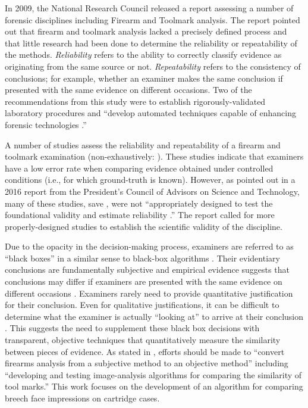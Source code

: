 \documentclass[11pt,]{isuthesis}
\begin{document}
In 2009, the National Research Council released a report assessing a number of forensic disciplines including Firearm and Toolmark analysis.
The report pointed out that firearm and toolmark analysis lacked a precisely defined process and that little research had been done to determine the reliability or repeatability of the methods.
\emph{Reliability} refers to the ability to correctly classify evidence as originating from the same source or not.
\emph{Repeatability} refers to the consistency of conclusions; for example, whether an examiner makes the same conclusion if presented with the same evidence on different occasions.
Two of the recommendations from this study were to establish rigorously-validated laboratory procedures and ``develop automated techniques capable of enhancing forensic technologies \citep{council_strengthening_2009}.''

A number of studies assess the reliability and repeatability of a firearm and toolmark examination (non-exhaustively: \citet{DeFrance2003,Hamby2009,fadulempirical2011,Stroman2014,Baldwin2014,Smith2016,MATTIJSSEN2020}).
These studies indicate that examiners have a low error rate when comparing evidence obtained under controlled conditions (i.e., for which ground-truth is known).
However, as pointed out in a 2016 report from the President's Council of Advisors on Science and Technology, many of these studies, save \citet{Baldwin2014}, were not ``appropriately designed to test the foundational validity and estimate reliability \citep{pcast2016}.''
The report called for more properly-designed studies to establish the scientific validity of the discipline.

Due to the opacity in the decision-making process, examiners are referred to as ``black boxes'' in a similar sense to black-box algorithms \citep{HumanFactorsCommittee2020}.
Their evidentiary conclusions are fundamentally subjective and empirical evidence suggests that conclusions may differ if examiners are presented with the same evidence on different occasions \citep{Ulery2011,Ulery2012}.
Examiners rarely need to provide quantitative justification for their conclusion.
Even for qualitative justifications, it can be difficult to determine what the examiner is actually ``looking at'' to arrive at their conclusion \citep{Ulery2014}.
This suggests the need to supplement these black box decisions with transparent, objective techniques that quantitatively measure the similarity between pieces of evidence.
As stated in \citet{pcast2016}, efforts should be made to ``convert firearms analysis from a subjective method to an objective method'' including ``developing and testing image-analysis algorithms for comparing the similarity of tool marks.''
This work focuses on the development of an algorithm for comparing breech face impressions on cartridge cases.
\end{document}
